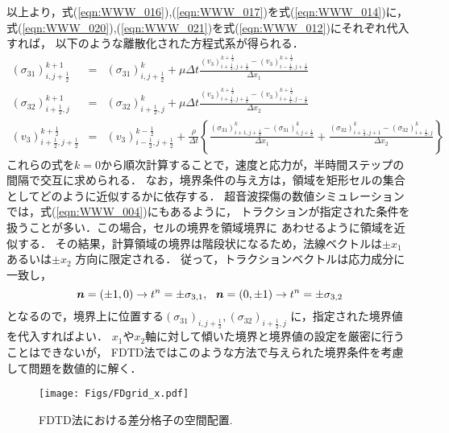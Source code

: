 以上より，式(\ref{eqn:WWW_016}),(\ref{eqn:WWW_017})を式(\ref{eqn:WWW_014})に，
式(\ref{eqn:WWW_020}),(\ref{eqn:WWW_021})を式(\ref{eqn:WWW_012})にそれぞれ代入すれば，
以下のような離散化された方程式系が得られる．
\begin{eqnarray}
	(\sigma_{31})^{k+1}_{i,j+\frac{1}{2}} &=& 
	(\sigma_{31})^{k} _{i,j+\frac{1}{2}}
	+
	\mu \Delta t 
	\frac{
		(v_3)_{i+\frac{1}{2},j+\frac{1}{2}}^{k+\frac{1}{2}}
		-
		(v_3)_{i-\frac{1}{2},j+\frac{1}{2}}^{k+\frac{1}{2}} 
	}{\Delta x_1}
	\label{eqn:WWW_022}
	\\
	(\sigma_{32})^{k+1}_{i+\frac{1}{2},j} &=& 
	(\sigma_{32})^{k}_{i+\frac{1}{2},j} 
	+
	\mu \Delta t 
	\frac{
		(v_3)_{i+\frac{1}{2},j+\frac{1}{2}}^{k+\frac{1}{2}} 
		-
		(v_3)_{i+\frac{1}{2},j-\frac{1}{2}}^{k+\frac{1}{2}} 
	}{\Delta x_2}
	\label{eqn:WWW_023}
	\\
	(v_3)_{i+\frac{1}{2},j+\frac{1}{2}}^{k+\frac{1}{2}} 
	&=& 
	(v_3)_{i-\frac{1}{2},j+\frac{1}{2}}^{k-\frac{1}{2}} 
	+
	\frac{\rho}{\Delta t} \left\{
		\frac{(\sigma_{31})^k_{i+1,j+\frac{1}{2}} - (\sigma_{31})^k_{i,j+\frac{1}{2}} }{\Delta x_1}
		+
		\frac{(\sigma_{32})^k_{i+\frac{1}{2},j+1} - (\sigma_{32})^k_{i+\frac{1}{2},j} }{\Delta x_2}
	\right\} 
	\label{eqn:WWW_024}
\end{eqnarray}
これらの式を$k=0$から順次計算することで，速度と応力が，半時間ステップの間隔で交互に求められる．
なお，境界条件の与え方は，領域を矩形セルの集合としてどのように近似するかに依存する．
超音波探傷の数値シミュレーションでは，式(\ref{eqn:WWW_004})にもあるように，
トラクションが指定された条件を扱うことが多い．この場合，セルの境界を領域境界に
あわせるように領域を近似する．
その結果，計算領域の境界は階段状になるため，法線ベクトルは$\pm x_1$あるいは$\pm x_2$
方向に限定される．
従って，トラクションベクトルは応力成分に一致し，
\[
	\fat{n}=(\pm 1, 0) \rightarrow t^{n}=\pm \sigma_{3,1}, \ \ 
	\fat{n}=(0, \pm1 ) \rightarrow t^{n}=\pm \sigma_{3,2}
	\label{eqn:}
\]
となるので，境界上に位置する$(\sigma_{31})_{i,j+\frac{1}{2}},(\sigma_{32})_{i+\frac{1}{2},j}$
に，指定された境界値を代入すればよい．
$x_1$や$x_2$軸に対して傾いた境界と境界値の設定を厳密に行うことはできないが，
FDTD法ではこのような方法で与えられた境界条件を考慮して問題を数値的に解く．
\begin{figure}[h]
	\begin{center}
	\texttt{[image: Figs/FDgrid\_x.pdf]} 
	\end{center}
	\caption{FDTD法における差分格子の空間配置.} 
	\label{fig:staggered}
\end{figure}
